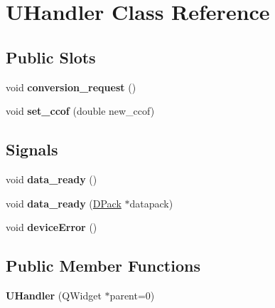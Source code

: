 \hypertarget{class_u_handler}{
\section{UHandler Class Reference}
\label{class_u_handler}
}
\subsection*{Public Slots}
\begin{DoxyCompactItemize}
\item 
\hypertarget{class_u_handler_a40e403e70909a4bb805bd97195ac92d7}{
void {\bfseries conversion\_\-request} ()}
\label{class_u_handler_a40e403e70909a4bb805bd97195ac92d7}

\item 
\hypertarget{class_u_handler_a3b5a9c04c309c144617781062e5cfabe}{
void {\bfseries set\_\-ccof} (double new\_\-ccof)}
\label{class_u_handler_a3b5a9c04c309c144617781062e5cfabe}

\end{DoxyCompactItemize}
\subsection*{Signals}
\begin{DoxyCompactItemize}
\item 
\hypertarget{class_u_handler_a742a8dab7c61c99f9435f598a7afa5fe}{
void {\bfseries data\_\-ready} ()}
\label{class_u_handler_a742a8dab7c61c99f9435f598a7afa5fe}

\item 
\hypertarget{class_u_handler_a968c8e73674c32ac0742609e30dcaed5}{
void {\bfseries data\_\-ready} (\hyperlink{struct_d_pack}{DPack} $\ast$datapack)}
\label{class_u_handler_a968c8e73674c32ac0742609e30dcaed5}

\item 
\hypertarget{class_u_handler_a67bbedf1977c775242c577aceaa5f60a}{
void {\bfseries deviceError} ()}
\label{class_u_handler_a67bbedf1977c775242c577aceaa5f60a}

\end{DoxyCompactItemize}
\subsection*{Public Member Functions}
\begin{DoxyCompactItemize}
\item 
\hypertarget{class_u_handler_af7d92c46f1bb7aec74f996518669d7d7}{
{\bfseries UHandler} (QWidget $\ast$parent=0)}
\label{class_u_handler_af7d92c46f1bb7aec74f996518669d7d7}

\end{DoxyCompactItemize}
